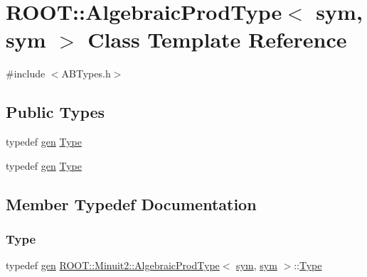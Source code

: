\hypertarget{classROOT_1_1Minuit2_1_1AlgebraicProdType_3_01sym_00_01sym_01_4}{}\section{R\+O\+OT\+:\+:Algebraic\+Prod\+Type$<$ sym, sym $>$ Class Template Reference}
\label{classROOT_1_1Minuit2_1_1AlgebraicProdType_3_01sym_00_01sym_01_4}


{\ttfamily \#include $<$A\+B\+Types.\+h$>$}

\subsection*{Public Types}
\begin{DoxyCompactItemize}
\item 
typedef \mbox{\hyperlink{classROOT_1_1Minuit2_1_1gen}{gen}} \mbox{\hyperlink{classROOT_1_1Minuit2_1_1AlgebraicProdType_3_01sym_00_01sym_01_4_a0b02f8928c35c1a4580a0b80b4ed50a1}{Type}}
\item 
typedef \mbox{\hyperlink{classROOT_1_1Minuit2_1_1gen}{gen}} \mbox{\hyperlink{classROOT_1_1Minuit2_1_1AlgebraicProdType_3_01sym_00_01sym_01_4_a0b02f8928c35c1a4580a0b80b4ed50a1}{Type}}
\end{DoxyCompactItemize}


\subsection{Member Typedef Documentation}
\mbox{\label{classROOT_1_1Minuit2_1_1AlgebraicProdType_3_01sym_00_01sym_01_4_a0b02f8928c35c1a4580a0b80b4ed50a1}} 
\subsubsection{\texorpdfstring{Type}{Type}\hspace{0.1cm}{\footnotesize\ttfamily [1/2]}}
{\footnotesize\ttfamily typedef \mbox{\hyperlink{classROOT_1_1Minuit2_1_1gen}{gen}} \mbox{\hyperlink{classROOT_1_1Minuit2_1_1AlgebraicProdType}{R\+O\+O\+T\+::\+Minuit2\+::\+Algebraic\+Prod\+Type}}$<$ \mbox{\hyperlink{classROOT_1_1Minuit2_1_1sym}{sym}}, \mbox{\hyperlink{classROOT_1_1Minuit2_1_1sym}{sym}} $>$\+::\mbox{\hyperlink{classROOT_1_1Minuit2_1_1AlgebraicProdType_3_01sym_00_01sym_01_4_a0b02f8928c35c1a4580a0b80b4ed50a1}{Type}}}

